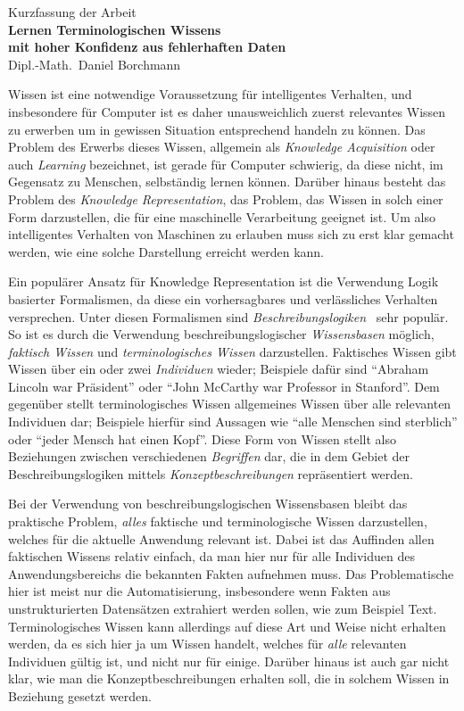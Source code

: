 \documentclass[ngerman,fleqn,DIV=12]{scrartcl}
\begin{document}
\medskip
\begin{center}
  \normalsize Kurzfassung der Arbeit\\
  \LARGE\textbf{Lernen Terminologischen Wissens\\ mit hoher Konfidenz aus fehlerhaften Daten}\\
  \bigskip%
  \large Dipl.-Math.\ Daniel Borchmann
\end{center}
\bigskip
\bigskip

\noindent
Wissen ist eine notwendige Voraussetzung für intelligentes Verhalten, und insbesondere für
Computer ist es daher unausweichlich zuerst relevantes Wissen zu erwerben um in gewissen
Situation entsprechend handeln zu können.  Das Problem des Erwerbs dieses Wissen,
allgemein als \emph{Knowledge Acquisition} oder auch \emph{Learning} bezeichnet, ist
gerade für Computer schwierig, da diese nicht, im Gegensatz zu Menschen, selbständig
lernen können.  Darüber hinaus besteht das Problem des \emph{Knowledge Representation},
\dh das Problem, das Wissen in solch einer Form darzustellen, die für eine maschinelle
Verarbeitung geeignet ist.  Um also intelligentes Verhalten von Maschinen zu erlauben muss
sich zu erst klar gemacht werden, wie eine solche Darstellung erreicht werden kann.

Ein populärer Ansatz für Knowledge Representation ist die Verwendung Logik basierter
Formalismen, da diese ein vorhersagbares und verlässliches Verhalten versprechen.  Unter
diesen Formalismen sind \emph{Beschreibungslogiken}~\cite{DLhandbook} sehr populär.  So
ist es durch die Verwendung beschreibungslogischer \emph{Wissensbasen} möglich,
\emph{faktisch Wissen} und \emph{terminologisches Wissen} darzustellen.  Faktisches Wissen
gibt Wissen über ein oder zwei \emph{Individuen} wieder; Beispiele dafür sind
\enquote{Abraham Lincoln war Präsident} oder \enquote{John McCarthy war Professor in
  Stanford}.  Dem gegenüber stellt terminologisches Wissen allgemeines Wissen über alle
relevanten Individuen dar; Beispiele hierfür sind Aussagen wie \enquote{alle Menschen sind
  sterblich} oder \enquote{jeder Mensch hat einen Kopf}.  Diese Form von Wissen stellt
also Beziehungen zwischen verschiedenen \emph{Begriffen} dar, die in dem Gebiet der
Beschreibungslogiken mittels \emph{Konzeptbeschreibungen} repräsentiert werden.

Bei der Verwendung von beschreibungslogischen Wissensbasen bleibt das praktische Problem,
\emph{alles} faktische und terminologische Wissen darzustellen, welches für die aktuelle
Anwendung relevant ist.  Dabei ist das Auffinden allen faktischen Wissens relativ einfach,
da man hier nur für alle Individuen des Anwendungsbereichs die bekannten Fakten aufnehmen
muss.  Das Problematische hier ist meist nur die Automatisierung, insbesondere wenn Fakten
aus unstrukturierten Datensätzen extrahiert werden sollen, wie zum Beispiel Text.
Terminologisches Wissen kann allerdings auf diese Art und Weise nicht erhalten werden, da
es sich hier ja um Wissen handelt, welches für \emph{alle} relevanten Individuen gültig
ist, und nicht nur für einige.  Darüber hinaus ist auch gar nicht klar, wie man die
Konzeptbeschreibungen erhalten soll, die in solchem Wissen in Beziehung gesetzt werden.
\end{document}

